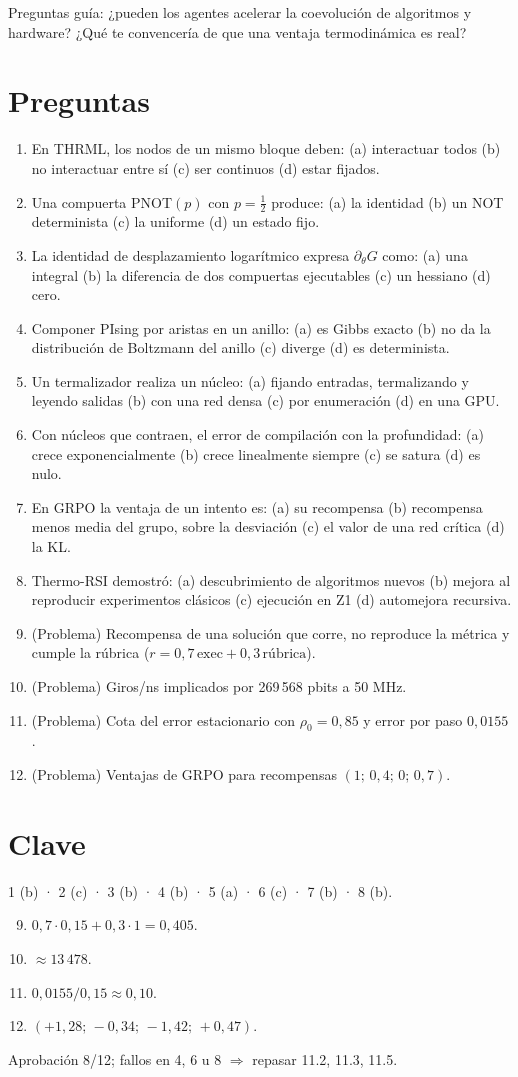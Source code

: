\documentclass[11pt,a4paper]{article}
\begin{document}
\noindent Preguntas guía: ¿pueden los agentes acelerar la coevolución de algoritmos y hardware? ¿Qué te convencería de que una ventaja termodinámica es real?
\section*{Preguntas}
\begin{enumerate}
\item En THRML, los nodos de un mismo bloque deben: (a) interactuar todos (b) no interactuar entre sí (c) ser continuos (d) estar fijados.
\item Una compuerta PNOT$(p)$ con $p=\tfrac12$ produce: (a) la identidad (b) un NOT determinista (c) la uniforme (d) un estado fijo.
\item La identidad de desplazamiento logarítmico expresa $\partial_\theta G$ como: (a) una integral (b) la diferencia de dos compuertas ejecutables (c) un hessiano (d) cero.
\item Componer PIsing por aristas en un anillo: (a) es Gibbs exacto (b) no da la distribución de Boltzmann del anillo (c) diverge (d) es determinista.
\item Un termalizador realiza un núcleo: (a) fijando entradas, termalizando y leyendo salidas (b) con una red densa (c) por enumeración (d) en una GPU.
\item Con núcleos que contraen, el error de compilación con la profundidad: (a) crece exponencialmente (b) crece linealmente siempre (c) se satura (d) es nulo.
\item En GRPO la ventaja de un intento es: (a) su recompensa (b) recompensa menos media del grupo, sobre la desviación (c) el valor de una red crítica (d) la KL.
\item Thermo-RSI demostró: (a) descubrimiento de algoritmos nuevos (b) mejora al reproducir experimentos clásicos (c) ejecución en Z1 (d) automejora recursiva.
\item (Problema) Recompensa de una solución que corre, no reproduce la métrica y cumple la rúbrica ($r=0{,}7\,\text{exec}+0{,}3\,\text{rúbrica}$).
\item (Problema) Giros/ns implicados por 269\,568 pbits a 50 MHz.
\item (Problema) Cota del error estacionario con $\rho_0=0{,}85$ y error por paso $0{,}0155$.
\item (Problema) Ventajas de GRPO para recompensas $(1;\,0{,}4;\,0;\,0{,}7)$.
\end{enumerate}
\newpage
\section*{Clave}
1 (b) · 2 (c) · 3 (b) · 4 (b) · 5 (a) · 6 (c) · 7 (b) · 8 (b).
\begin{enumerate}\setcounter{enumi}{8}
\item $0{,}7\cdot0{,}15+0{,}3\cdot1=0{,}405$.
\item $\approx13\,478$.
\item $0{,}0155/0{,}15\approx0{,}10$.
\item $(+1{,}28;\,-0{,}34;\,-1{,}42;\,+0{,}47)$.
\end{enumerate}
Aprobación 8/12; fallos en 4, 6 u 8 $\Rightarrow$ repasar 11.2, 11.3, 11.5.
\end{document}
